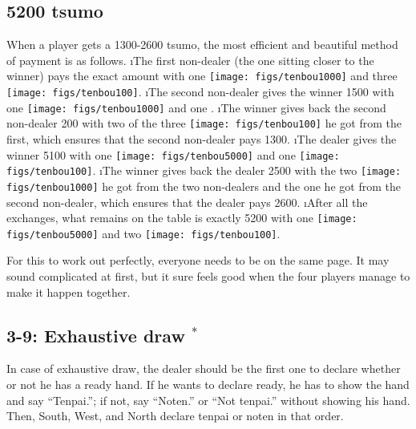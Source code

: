 \subsection*{5200 {\jap tsumo}}
When a player gets a 1300-2600 {\jap tsumo}, the most efficient and beautiful method of payment is as follows.
\be
\i The first non-dealer (the one sitting closer to the winner) pays the exact amount with one \texttt{[image: figs/tenbou1000]} and three \linebreak \texttt{[image: figs/tenbou100]}.
\i The second non-dealer gives the winner 1500 with one \linebreak \texttt{[image: figs/tenbou1000]} and one .
\i The winner gives back the second non-dealer 200 with two of the three \texttt{[image: figs/tenbou100]} he got from the first,
which ensures that the second non-dealer pays 1300.
\i The dealer gives the winner 5100 with one \texttt{[image: figs/tenbou5000]} and one \texttt{[image: figs/tenbou100]}.
\i The winner gives back the dealer 2500 with the two \linebreak \texttt{[image: figs/tenbou1000]} he got from the two non-dealers and the one \linebreak {} he got from the second non-dealer, which ensures that the dealer pays 2600.
\i After all the exchanges, what remains on the table is exactly 5200 with one \texttt{[image: figs/tenbou5000]} and two \texttt{[image: figs/tenbou100]}.
\ee

For this to work out perfectly, everyone needs to be on the same page. It may sound complicated at first, but it sure feels good when the four players manage to make it happen together. 

\subsection*{3-9: Exhaustive draw $^{*}$}
In case of exhaustive draw, the dealer should be the first one to declare whether or not he has a ready hand. If he wants to declare ready, he has to show the hand and say ``{\jap Tenpai}.''; if not, say ``{\jap Noten}.'' or ``Not {\jap tenpai}.'' without showing his hand. Then, South, West, and North declare {\jap tenpai} or {\jap noten} in that order. 

